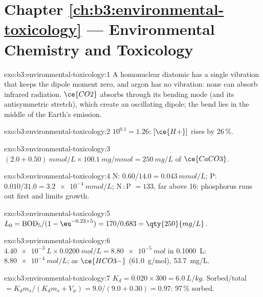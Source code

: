 \section*{Chapter \ref{ch:b3:environmental-toxicology} --- Environmental Chemistry and Toxicology}

\begin{solution}{exo:b3:environmental-toxicology:1}
A homonuclear diatomic has a single vibration that keeps the dipole moment zero,
and argon has no vibration: none can absorb infrared radiation. $\ce{CO2}$ absorbs through
its bending mode (and its antisymmetric stretch), which create an oscillating
dipole; the bend lies in the middle of the Earth's emission.
\end{solution}

\begin{solution}{exo:b3:environmental-toxicology:2}
$10^{0.1} = 1.26$: $[\ce{H+}]$ rises by 26\,\%.
\end{solution}

\begin{solution}{exo:b3:environmental-toxicology:3}
$(2.0 + 0.50)\ \unit{mmol/L} \times \qty{100.1}{mg/mmol} = \qty{250}{mg/L}$ of $\ce{CaCO3}$.
\end{solution}

\begin{solution}{exo:b3:environmental-toxicology:4}
N: $0.60/14.0 = \qty{0.043}{mmol/L}$; P: $0.010/31.0 = \qty{3.2e-4}{mmol/L}$; N\,:\,P $= 133$, far above 16: phosphorus runs out
first and limits growth.
\end{solution}

\begin{solution}{exo:b3:environmental-toxicology:5}
$L_0 = \mathrm{BOD_5}/(1 - \eu^{-0.23 \times 5}) = 170/0.683 = \qty{250}{mg/L}$.
\end{solution}

\begin{solution}{exo:b3:environmental-toxicology:6}
$\qty{4.40e-3}{L} \times \qty{0.0200}{mol/L} = \qty{8.80e-5}{mol}$ in \qty{0.1000}{L}:  $\qty{8.80e-4}{mol/L}$; as $\ce{HCO3-}$ (\qty{61.0}{g/mol}),
\qty{53.7}{mg/L}.
\end{solution}

\begin{solution}{exo:b3:environmental-toxicology:7}
$K_d = 0.020 \times 300 = \qty{6.0}{L/kg}$. Sorbed/total $= K_dm_s/(K_dm_s + V_w) = 9.0/(9.0 + 0.30) = 0.97$: 97\,\% sorbed.
\end{solution}

